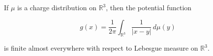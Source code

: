 If $\mu$ is a charge distribution on $\mathbb{R}^3$, then the potential function

$$g(x) = \frac{1}{2\pi} \int_{\mathbb{R}^3} \frac{1}{|x - y|} \, d\mu(y)$$

is finite almost everywhere with respect to Lebesgue measure on $\mathbb{R}^3$.
